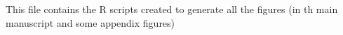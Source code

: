 This file contains the R scripts created to generate all the figures (in th main manuscript and some appendix figures)
